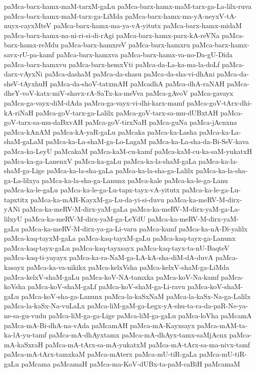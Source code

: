 {paMca-barx-hamx-maM-tarxM-gaLu
paMca-barx-hamx-maM-tarx-ga-La-lilx-ruva
paMca-barx-hamx-maM-tarx-ga-LiMda
paMca-barx-hamx-ma-yA-neyxV-tA-nuyx-cayxMteV
paMca-barx-hamx-ma-ya-vA-yitutx
paMca-barx-hamx-midaM
paMca-barx-hamx-na-ni-ri-si-di-rAgi
paMca-barx-hamx-parx-kA-reVNa
paMca-barx-hamx-reMdu
paMca-barx-hamxreV
paMca-barx-hamxru
paMca-barx-hamx-savx-rU-pa-kamf
paMca-barx-hamxva
paMca-barx-hamx-va-no-Da-gU-Dida
paMca-barx-hamxvu
paMca-barx-hemxVti
paMca-da-La-ka-ma-la-doLf
paMca-darx-vAyxNi
paMca-dashaM
paMca-da-shasu
paMca-da-sha-vi-dhAni
paMca-da-sheV-tAyxhuH
paMca-da-shoV-tatxmAH
paMcadhA
paMca-dhA-raNAH
paMca-dheY-voV-katx-miV-shavx-rA-SaTx-ka-meVva
paMca-gAvoV
paMca-gavayx
paMca-ga-vayx-diM-dAda
paMca-ga-vayx-vi-dhi-karx-mamf
paMca-goV-tArx-dhi-kA-riNaH
paMca-goV-tarx-ga-Lalilx
paMca-goV-tarx-sa-mu-dUBxtAH
paMca-goV-tarx-sa-mu-daBxvAH
paMca-goV-tirxNaH
paMca-guNa
paMca-jAcnxna
paMca-kAnAM
paMca-kA-yaR-gaLu
paMcaka
paMca-ka-Lasha
paMca-ka-La-shaM-gaLaM
paMca-ka-La-shaM-ga-Lo-LagaM
paMca-ka-La-sha-da-Bi-SeV-kava
paMca-ka-LeyU
paMcakaM
paMca-kaM-cu-kamf
paMca-kaM-cu-ka-saM-yukatxH
paMca-ka-ga-LanenxV
paMca-ka-gaLu
paMca-ka-la-shaM-gaLa
paMca-ka-la-shaM-ga-Lige
paMca-ka-la-sha-gaLa
paMca-ka-la-sha-ga-Lalilx
paMca-ka-la-sha-ga-La-lilxya
paMca-ka-la-sha-ga-Lanunx
paMca-kale
paMca-ka-le-ga-Lanu
paMca-ka-le-gaLu
paMca-ka-le-ga-Lu-tapx-tayx-vA-yitutx
paMca-ka-le-ga-Lu-tapxtitx
paMca-ka-mAR-KayxM-ga-Lu-da-yi-si-duvu
paMca-ka-meRV-M-dirx-yANi
paMca-ka-meRV-M-dirx-yaM-gaLa
paMca-ka-meRV-M-dirx-yaM-ga-La-lilxyU
paMca-ka-meRV-M-dirx-yaM-ga-LeYdU
paMca-ka-meRV-M-dirx-yaM-gaLu
paMca-ka-meRV-M-dirx-ya-ga-Li-varu
paMca-kamf
paMca-ka-nA-Di-yalilx
paMca-kaq-tayxM-gaLa
paMca-kaq-tayxM-gaLu
paMca-kaq-tayx-ga-Lanunx
paMca-kaq-tayx-gaLu
paMca-kaq-tayxsayx
paMca-kaq-tayx-ta-nU-BaqteV
paMca-kaq-ti-yayayx
paMca-ka-ra-NaM-ga-LA-kA-sha-diM-dA-duvA
paMca-kasayx
paMca-ka-va-nikikx
paMca-kelxVsha
paMca-kelxV-shaM-ga-LiMda
paMca-kelxV-shaM-gaLu
paMca-koV-NA-tamxka
paMca-koV-Na-kamf
paMca-koVsha
paMca-koV-shaM-gaLf
paMca-koV-shaM-ga-Li-ravu
paMca-koV-shaM-gaLu
paMca-koV-sha-ga-Lanunx
paMca-la-kaSxNaM
paMca-la-kaSx-Na-ga-Lalilx
paMca-la-kaSx-Na-vuLaLx
paMca-liM-gaM-ga-Legx-yA-shu-ta-ra-da-paR-Ne-ya-ne-sa-gu-vudu
paMca-liM-ga-ga-Lige
paMca-liM-ga-gaLu
paMca-loVha
paMcamA
paMca-mA-Bi-dhA-na-vAda
paMcamAH
paMca-mA-Kayxsayx
paMca-mAM-ta-ka-lA-yu-tamf
paMca-mA-dhAyxtamx
paMca-mA-dhAyx-tamx-saMjAcnx
paMca-mA-kaSxraH
paMca-mA-tArx-sa-mA-yukatxM
paMca-mA-tArx-sa-ma-nivx-tamf
paMca-mA-tArx-tamxkaM
paMca-mAterx
paMca-mU-tiR-gaLa
paMca-mU-tiR-gaLu
paMcama
paMcamaH
paMca-ma-KoV-dUBx-ta-paM-caBiH
paMcamaM
}
